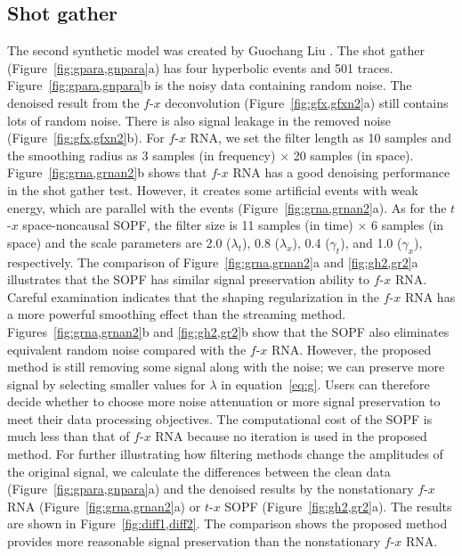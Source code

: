 \subsection{Shot gather}
The second synthetic model was created by Guochang Liu
\cite[]{Liu12}. The shot gather (Figure~\ref{fig:gpara,gnpara}a) has
four hyperbolic events and 501 traces. Figure~\ref{fig:gpara,gnpara}b
is the noisy data containing random noise. The denoised result from
the $f$-$x$ deconvolution (Figure~\ref{fig:gfx,gfxn2}a) still contains
lots of random noise. There is also signal leakage in the removed
noise (Figure~\ref{fig:gfx,gfxn2}b). For $f$-$x$ RNA, we set the
filter length as 10 samples and the smoothing radius
as 3 samples (in frequency)
$\times$ 20 samples (in
space). Figure~\ref{fig:grna,grnan2}b shows that $f$-$x$ RNA
has a good denoising performance in the shot gather test. However, it
creates some artificial events with weak energy, which are parallel
with the events (Figure~\ref{fig:grna,grnan2}a). As for the $t$-$x$
space-noncausal SOPF, the filter size is 11
samples (in time) $\times$ 6 samples
(in space) and the scale parameters are 2.0 ($\lambda_t$), 0.8
($\lambda_x$), 0.4 ($\gamma_t$), and 1.0 ($\gamma_x$),
respectively. The comparison of Figure~\ref{fig:grna,grnan2}a
and \ref{fig:gh2,gr2}a illustrates that the SOPF has similar signal
preservation ability to $f$-$x$ RNA. Careful
examination indicates that the shaping regularization
\cite[]{Fomel07} in the $f$-$x$ RNA has a more powerful smoothing
effect than the streaming method. Figures~\ref{fig:grna,grnan2}b and
\ref{fig:gh2,gr2}b show that the SOPF also 
eliminates equivalent random noise compared with the $f$-$x$
RNA. However, the proposed method is still removing some signal along
with the noise; we can preserve more signal by selecting smaller
values for $\lambda$ in equation~\ref{eq:g}. Users can therefore
decide whether to choose more noise attenuation or more signal
preservation to meet their data processing objectives. The
computational cost of the SOPF is much less than that of $f$-$x$ RNA
because no iteration is used in the proposed method. For further
illustrating how filtering methods change the amplitudes of the
original signal, we calculate the differences between the clean data
(Figure~\ref{fig:gpara,gnpara}a) and the denoised results by the
nonstationary $f$-$x$ RNA (Figure~\ref{fig:grna,grnan2}a) or 
$t$-$x$ SOPF (Figure~\ref{fig:gh2,gr2}a). The
results are shown in Figure~\ref{fig:diff1,diff2}. The comparison
shows the proposed method provides more reasonable signal preservation
than the nonstationary $f$-$x$ RNA.

